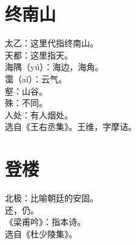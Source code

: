 \documentclass[a4paper, 12pt]{article}
\begin{document}
    \section{终南山}
        \noindent 太乙：这里代指终南山。
        \\ 天都：这里指天。
        \\ 海隅（y\'{u}）：海边，海角。
        \\ 霭（a\v{i}）：云气。
        \\ 壑：山谷。
        \\ 殊：不同。
        \\ 人处：有人烟处。
        \\ 选自《王右丞集》。王维，字摩诘。
    \section{登楼}
        \noindent 北极：比喻朝廷的安固。
        \\ 还，仍。
        \\ 《梁甫吟》：指本诗。
        \\ 选自《杜少陵集》。
\end{document}
